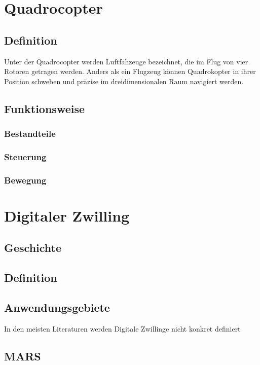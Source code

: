 \section{Quadrocopter}

\subsection{Definition}
Unter der Quadrocopter werden Luftfahzeuge bezeichnet, die im Flug von vier Rotoren getragen werden. Anders als ein Flugzeug können Quadrokopter in ihrer Position schweben und präzise im dreidimensionalen Raum navigiert werden. 

\subsection{Funktionsweise}
\subsubsection{Bestandteile}
\subsubsection{Steuerung}
\subsubsection{Bewegung}



\section{Digitaler Zwilling}
\subsection{Geschichte}
\subsection{Definition}
\subsection{Anwendungsgebiete}
In den meisten Literaturen werden Digitale Zwillinge nicht konkret definiert 

\subsection{MARS}
  
